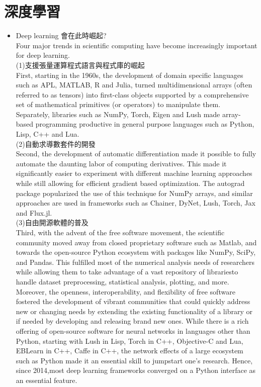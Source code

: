 \documentclass[14pt,a4paper]{report}  %
\begin{document}
\section{深度學習}
\begin{itemize}

\item Deep learning 會在此時崛起?\\
\qquad Four major trends in scientific computing have become increasingly important for deep learning.\\

(1)\quad 支援張量運算程式語言與程式庫的崛起\\ First, starting in the 1960s, the development of domain specific languages such as APL, MATLAB, R and Julia, turned multidimensional arrays (often referred to as tensors) into first-class objects supported by a comprehensive set of mathematical primitives (or operators) to manipulate them.\\
Separately, libraries such as NumPy, Torch, Eigen and Lush made array-based programming productive in general purpose languages such as Python, Lisp, C++ and Lua.\\

(2)\quad 自動求導數套件的開發\\ Second, the development of automatic differentiation made it possible to fully automate the daunting labor of computing derivatives. This made it significantly easier to experiment with different machine learning approaches while still allowing for efficient gradient based optimization. The autograd package popularized the use of this technique for NumPy arrays, and similar approaches are used in frameworks such as Chainer, DyNet, Lush, Torch, Jax and Flux.jl.\\

(3)\quad 自由開源軟體的普及\\ Third, with the advent of the free software movement, the scientific community moved away from closed proprietary software such as Matlab, and towards the open-source Python ecosystem with packages like NumPy, SciPy, and Pandas. This fulfilled most of the numerical analysis needs of researchers while allowing them to take advantage of a vast repository of librariesto handle dataset preprocessing, statistical analysis, plotting, and more.\\
Moreover, the openness, interoperability, and flexibility of free software fostered the development of vibrant communities that could quickly address new or changing needs by extending the existing functionality of a library or if needed by developing and releasing brand new ones. While there is a rich offering of open-source software for neural networks in languages other than Python, starting with Lush in Lisp, Torch in C++, Objective-C and Lua, EBLearn in C++, Caffe in C++, the network effects of a large ecosystem such as Python made it an essential skill to jumpstart one’s research. Hence, since 2014,most deep learning frameworks converged on a Python interface as an essential feature.\\


\end{itemize}
\end{document}
